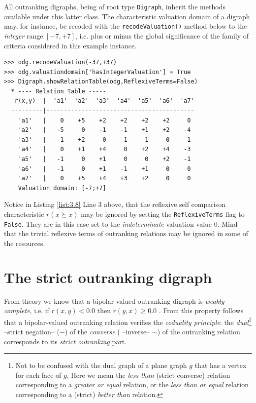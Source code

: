 All outranking digraphs, being of root type {\tt Digraph}, inherit the methods available under this latter class. The characteristic valuation domain of a digraph may, for instance,  be recoded with the {\tt recodeValuation()} method below to the {\em integer\/} range $[-7,+7]$, i.e. plus or minus the global significance of the family of criteria considered in this example instance.
\begin{lstlisting}[caption={Recoding the digraph valuation},label=list:3.8]
>>> odg.recodeValuation(-37,+37)
>>> odg.valuationdomain['hasIntegerValuation'] = True
>>> Digraph.showRelationTable(odg,ReflexiveTerms=False)
  * ---- Relation Table -----
   r(x,y)  |  'a1'  'a2'  'a3'  'a4'  'a5'  'a6'  'a7'	  
  ---------|------------------------------------------
    'a1'   |    0    +5    +2    +2    +2    +2     0	 
    'a2'   |   -5     0    -1    -1    +1    +2    -4	 
    'a3'   |   -1    +2     0    -1    -1     0    -1	 
    'a4'   |    0    +1    +4     0    +2    +4    -3	 
    'a5'   |   -1     0    +1     0     0    +2    -1	 
    'a6'   |   -1     0    +1    -1    +1     0     0	 
    'a7'   |    0    +5    +4    +3    +2     0     0	 
    Valuation domain: [-7;+7]
\end{lstlisting}
Notice in Listing \ref{list:3.8} Line 3 above, that the reflexive self comparison characteristic $r(x \succsim x)$ may be ignored by setting the \texttt{ReflexiveTerms} flag to \texttt{False}. They are in this case set to the \emph{indeterminate} valuation value $0$. Mind that the trivial reflexive terms of outranking relations may be ignored in some of the \Digraph resources. 

\section{The strict outranking digraph}
\label{sec:3.5}

From theory we know that a bipolar-valued outranking digraph is \emph{weakly complete}, i.e. if $r(x,y) < 0.0$ then $r(y,x) \geq 0.0$ \citep{BIS-2013, ADT-L7}. From this property follows that a bipolar-valued outranking relation verifies the \emph{coduality principle}: the \emph{dual}\footnote{Not to be confused with the dual graph of a plane graph $g$ that has a vertex for each face of $g$. Here we mean the \emph{less than} (strict converse) relation corresponding to a \emph{greater or equal} relation, or the \emph{less than or equal} relation corresponding to a (strict) \emph{better than} relation.} --strict negation-- ($-$) of the \emph{converse} ( --inverse-- $\sim$) of the outranking relation corresponds to its {\em strict outranking\/} part.

